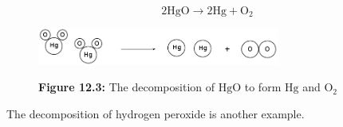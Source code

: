     \begin{equation}
    2\mathrm{HgO}\to 2\mathrm{Hg}+{\mathrm{O}}_{2}\tag{12.2}
      \end{equation}
    \setcounter{subfigure}{0}
	\begin{figure}[H] %
    \begin{center}
    \label{m38709*uid10!!!underscore!!!media}\label{m38709*uid10!!!underscore!!!printimage}\includegraphics[width=300px]{col11305.imgs/m38709_CG10C4_003.png} %
      \vspace{2pt}
    \vspace{\rubberspace}\par \begin{cnxcaption}
	  \small \textbf{Figure 12.3: }The decomposition of $\mathrm{HgO}$ to form $\mathrm{Hg}$ and ${\mathrm{O}}_{2}$
	\end{cnxcaption}
    \vspace{.1in}
    \end{center}
 \end{figure}       \par 
        \label{m38709*id63156}The decomposition of hydrogen peroxide is another example.\par 
\label{m38709*secfhsst!!!underscore!!!id163}
